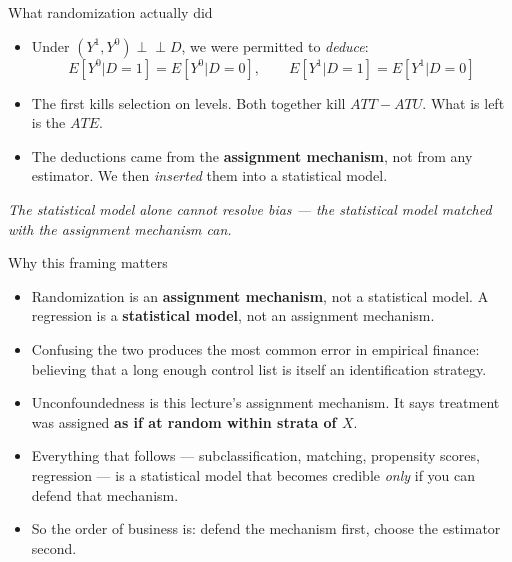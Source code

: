 \documentclass[
  11pt,
  ignorenonframetext,
  aspectratio=169,
]{beamer}
\providecommand{\tightlist}{%
  \setlength{\itemsep}{0pt}\setlength{\parskip}{0pt}}
\newcommand{\indep}{\perp\!\!\!\perp}
\begin{document}
\begin{frame}{What randomization actually did}
\protect{}\label{what-randomization-actually-did}
\begin{itemize}
\tightlist
\item
  Under \((Y^1,Y^0) \indep D\), we were permitted to \emph{deduce}: \[
  E[Y^0|D{=}1] = E[Y^0|D{=}0], \qquad E[Y^1|D{=}1] = E[Y^1|D{=}0]
  \]
\item
  The first kills selection on levels. Both together kill \(ATT - ATU\).
  What is left is the \(ATE\).
\item
  The deductions came from the \textbf{assignment mechanism}, not from
  any estimator. We then \emph{inserted} them into a statistical model.
\end{itemize}

\vspace{0.3em}
\begin{center}
\emph{The statistical model alone cannot resolve bias --- the statistical model matched with the assignment mechanism can.}
\end{center}
\end{frame}

\begin{frame}{Why this framing matters}
\protect{}\label{why-this-framing-matters}
\begin{itemize}
\tightlist
\item
  Randomization is an \textbf{assignment mechanism}, not a statistical
  model. A regression is a \textbf{statistical model}, not an assignment
  mechanism.
\item
  Confusing the two produces the most common error in empirical finance:
  believing that a long enough control list is itself an identification
  strategy.
\item
  Unconfoundedness is this lecture's assignment mechanism. It says
  treatment was assigned \textbf{as if at random within strata of
  \(X\)}.
\item
  Everything that follows --- subclassification, matching, propensity
  scores, regression --- is a statistical model that becomes credible
  \emph{only} if you can defend that mechanism.
\item
  So the order of business is: defend the mechanism first, choose the
  estimator second.
\end{itemize}
\end{frame}
\end{document}
